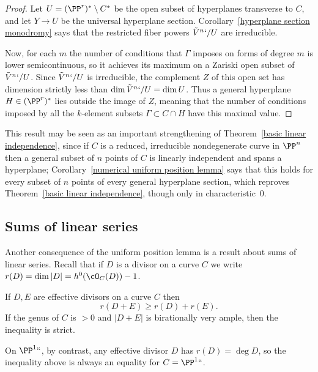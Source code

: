 \begin{proof} Let $U = (\PP^r)^* \setminus C^*$ be the open subset
of hyperplanes transverse to $C$, and let $Y\to U$ be the universal
hyperplane section.
Corollary~\ref{hyperplane section monodromy} says that the restricted
fiber powers $\tilde V^n`/U$ are irreducible.

Now, for each $m$ the number of conditions that $\Gamma$ imposes on
forms of degree $m$ is lower semicontinuous, so it achieves its maximum
on a Zariski open subset of $\tilde V^n`/U$. Since $\tilde V^n`/U$ is
irreducible, the complement $Z$ of this open set has dimension strictly
less than $\dim \tilde V^n`/U = \dim U$. Thus a general hyperplane $H
\in (\PP^r)^*$  lies outside the image of $Z$, meaning that the number
of conditions imposed by all the $k$-element subsets $\Gamma \subset C
\cap H$ have this maximal value.
\end{proof}

This result may be seen as an important strengthening of
Theorem~\ref{basic linear independence}, since if $C$ is a reduced,
irreducible nondegenerate curve in $\PP^n$ then a general subset
of $n$ points of $C$ is linearly independent and spans a hyperplane;
Corollary~\ref{numerical uniform position lemma} says that this 
holds
for every subset of $n$ points of every general hyperplane section,
which reproves Theorem~\ref{basic linear independence}, though only in
characteristic~0.

\subsection*{Sums of linear series}

Another consequence of the uniform position lemma is a result about sums
of linear series.
Recall that if $D$ is a divisor on a curve $C$ we write $r(D) = \dim |D|
= h^0(\cO_C(D))-1$.

\begin{corollary}\label{Clifford equality plus}
If $D,E$ are effective divisors on a curve $C$ then
$$
r(D+E) \geq r(D)+r(E).
$$
If the genus of $C$ is $>0$ and $|D+E|$ is 
birationally very ample,
%
%
then the inequality is strict.
\end{corollary}

On $\PP^1` `$, by contrast, any effective divisor $D$ has $r(D) = \deg
D$, so the inequality above is
always an equality for $C = \PP^1` `$.


